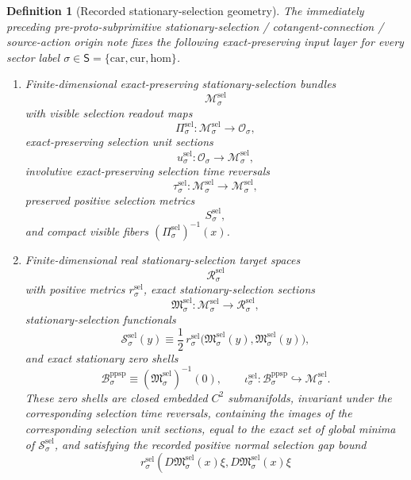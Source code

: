 \documentclass[11pt]{article}
\newcommand{\SectorSet}{\mathsf S}
\newcommand{\Car}{\mathrm{car}}
\newcommand{\Cur}{\mathrm{cur}}
\newcommand{\Hom}{\mathrm{hom}}
\newcommand{\ObjClass}[1]{\mathcal O_{#1}}
\newcommand{\PreProtoSubprimSpace}[1]{\mathcal B_{#1}^{\mathrm{ppsp}}}
\newcommand{\SelSpace}[1]{\mathcal M_{#1}^{\mathrm{sel}}}
\newcommand{\SelRead}[1]{\Pi_{#1}^{\mathrm{sel}}}
\newcommand{\SelUnit}[1]{u_{#1}^{\mathrm{sel}}}
\newcommand{\SelTimeRev}[1]{\tau_{#1}^{\mathrm{sel}}}
\newcommand{\SelMetric}[1]{S_{#1}^{\mathrm{sel}}}
\newcommand{\SelTarget}[1]{\mathcal R_{#1}^{\mathrm{sel}}}
\newcommand{\SelTargetMetric}[1]{r_{#1}^{\mathrm{sel}}}
\newcommand{\SelSection}[1]{\mathfrak M_{#1}^{\mathrm{sel}}}
\newcommand{\SelFunctional}[1]{\mathscr S_{#1}^{\mathrm{sel}}}
\newcommand{\SelInc}[1]{\iota_{#1}^{\mathrm{sel}}}
\newtheorem{definition}{Definition}
\begin{document}
\begin{definition}[Recorded stationary-selection geometry]
\label{def:recorded_selection_geometry}
The immediately preceding pre-proto-subprimitive stationary-selection / cotangent-connection / source-action origin note fixes the following exact-preserving input layer for every sector label \(\sigma\in\SectorSet=\{\Car,\Cur,\Hom\}\).
\begin{enumerate}
    \item Finite-dimensional exact-preserving stationary-selection bundles
    \[
    \SelSpace{\sigma}
    \]
    with visible selection readout maps
    \[
    \SelRead{\sigma}:\SelSpace{\sigma}\to\ObjClass{\sigma},
    \]
    exact-preserving selection unit sections
    \[
    \SelUnit{\sigma}:\ObjClass{\sigma}\to\SelSpace{\sigma},
    \]
    involutive exact-preserving selection time reversals
    \[
    \SelTimeRev{\sigma}:\SelSpace{\sigma}\to\SelSpace{\sigma},
    \]
    preserved positive selection metrics
    \[
    \SelMetric{\sigma},
    \]
    and compact visible fibers \((\SelRead{\sigma})^{-1}(x)\).
    \item Finite-dimensional real stationary-selection target spaces
    \[
    \SelTarget{\sigma}
    \]
    with positive metrics \(\SelTargetMetric{\sigma}\), exact stationary-selection sections
    \[
    \SelSection{\sigma}:\SelSpace{\sigma}\to\SelTarget{\sigma},
    \]
    stationary-selection functionals
    \begin{equation}
    \SelFunctional{\sigma}(y)\equiv \frac12\,
    \SelTargetMetric{\sigma}\bigl(\SelSection{\sigma}(y),\SelSection{\sigma}(y)\bigr),
    \label{eq:recorded_selection_functional}
    \end{equation}
    and exact stationary zero shells
    \begin{equation}
    \PreProtoSubprimSpace{\sigma}\equiv \left(\SelSection{\sigma}\right)^{-1}(0),
    \qquad
    \SelInc{\sigma}:\PreProtoSubprimSpace{\sigma}\hookrightarrow \SelSpace{\sigma}.
    \label{eq:recorded_selection_shell}
    \end{equation}
    These zero shells are closed embedded \(C^2\) submanifolds, invariant under the corresponding selection time reversals, containing the images of the corresponding selection unit sections, equal to the exact set of global minima of \(\SelFunctional{\sigma}\), and satisfying the recorded positive normal selection gap bound
    \begin{equation}
    \SelTargetMetric{\sigma}\!\left(
    D\SelSection{\sigma}(x)\xi,
    D\SelSection{\sigma}(x)\xi

\end{equation}
\end{enumerate}
\end{definition}
\end{document}
